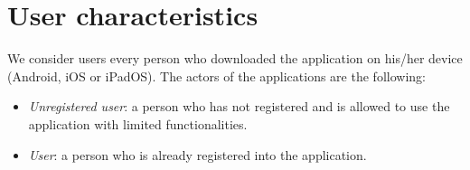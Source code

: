 \section{User characteristics}
We consider users every person who downloaded the application on his/her device (Android, iOS or iPadOS).
The actors of the applications are the following:
\begin{itemize}
    \item \textit {Unregistered user}: a person who has not registered and is allowed to use the application with limited functionalities.
    \item \textit {User}: a person who is already registered into the application.
\end{itemize}




\def\fillandplacepagenumber{%
 \par\pagestyle{empty}%
\vbox to 0pt{\vss}\vfill
\vbox to 0pt{\baselineskip0pt
   \hbox to\linewidth{\hss}%
   \setlength{\footskip}{70pt}
   \baselineskip\footskip
   \hbox to\linewidth{%
     \hfil\thepage\hfil}\vss}}








